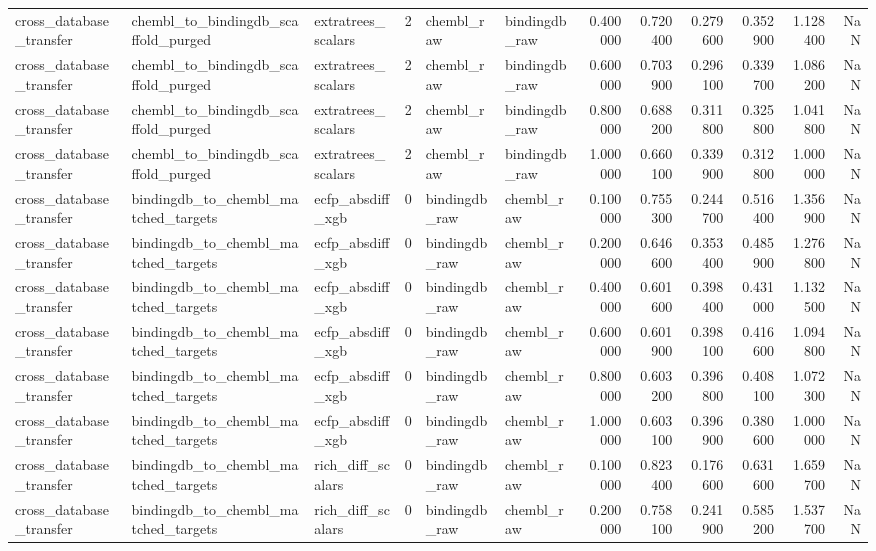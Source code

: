 \begin{longtable}{lllrllrrrrrr}
cross\_database\_transfer & chembl\_to\_bindingdb\_scaffold\_purged & extratrees\_scalars & 2 & chembl\_raw & bindingdb\_raw & 0.400000 & 0.720400 & 0.279600 & 0.352900 & 1.128400 & NaN \\
cross\_database\_transfer & chembl\_to\_bindingdb\_scaffold\_purged & extratrees\_scalars & 2 & chembl\_raw & bindingdb\_raw & 0.600000 & 0.703900 & 0.296100 & 0.339700 & 1.086200 & NaN \\
cross\_database\_transfer & chembl\_to\_bindingdb\_scaffold\_purged & extratrees\_scalars & 2 & chembl\_raw & bindingdb\_raw & 0.800000 & 0.688200 & 0.311800 & 0.325800 & 1.041800 & NaN \\
cross\_database\_transfer & chembl\_to\_bindingdb\_scaffold\_purged & extratrees\_scalars & 2 & chembl\_raw & bindingdb\_raw & 1.000000 & 0.660100 & 0.339900 & 0.312800 & 1.000000 & NaN \\
cross\_database\_transfer & bindingdb\_to\_chembl\_matched\_targets & ecfp\_absdiff\_xgb & 0 & bindingdb\_raw & chembl\_raw & 0.100000 & 0.755300 & 0.244700 & 0.516400 & 1.356900 & NaN \\
cross\_database\_transfer & bindingdb\_to\_chembl\_matched\_targets & ecfp\_absdiff\_xgb & 0 & bindingdb\_raw & chembl\_raw & 0.200000 & 0.646600 & 0.353400 & 0.485900 & 1.276800 & NaN \\
cross\_database\_transfer & bindingdb\_to\_chembl\_matched\_targets & ecfp\_absdiff\_xgb & 0 & bindingdb\_raw & chembl\_raw & 0.400000 & 0.601600 & 0.398400 & 0.431000 & 1.132500 & NaN \\
cross\_database\_transfer & bindingdb\_to\_chembl\_matched\_targets & ecfp\_absdiff\_xgb & 0 & bindingdb\_raw & chembl\_raw & 0.600000 & 0.601900 & 0.398100 & 0.416600 & 1.094800 & NaN \\
cross\_database\_transfer & bindingdb\_to\_chembl\_matched\_targets & ecfp\_absdiff\_xgb & 0 & bindingdb\_raw & chembl\_raw & 0.800000 & 0.603200 & 0.396800 & 0.408100 & 1.072300 & NaN \\
cross\_database\_transfer & bindingdb\_to\_chembl\_matched\_targets & ecfp\_absdiff\_xgb & 0 & bindingdb\_raw & chembl\_raw & 1.000000 & 0.603100 & 0.396900 & 0.380600 & 1.000000 & NaN \\
cross\_database\_transfer & bindingdb\_to\_chembl\_matched\_targets & rich\_diff\_scalars & 0 & bindingdb\_raw & chembl\_raw & 0.100000 & 0.823400 & 0.176600 & 0.631600 & 1.659700 & NaN \\
cross\_database\_transfer & bindingdb\_to\_chembl\_matched\_targets & rich\_diff\_scalars & 0 & bindingdb\_raw & chembl\_raw & 0.200000 & 0.758100 & 0.241900 & 0.585200 & 1.537700 & NaN \\

\end{longtable}
